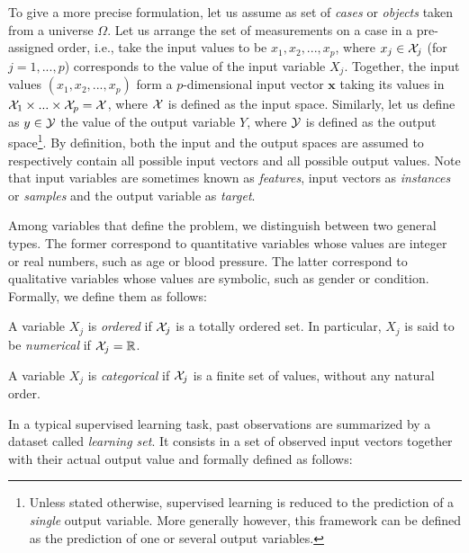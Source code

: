 To give a more precise formulation, let us assume as set of \textit{cases} or
\textit{objects} taken from a universe $\Omega$\label{ntn:omega}. Let us arrange the set of
measurements on a case in a pre-assigned order, i.e., take the input values to
be $x_1, x_2, ..., x_p$, where $x_j \in {\cal X}_j$\label{ntn:value-x_j}\label{ntn:space-X_j} (for $j = 1, ..., p$\label{ntn:p})
corresponds to the value of the input variable $X_j$\label{ntn:var-X_j}. Together, the input
values $(x_1, x_2, ..., x_p)$ form a $p$-dimensional input vector $\mathbf{x}$\label{ntn:sample-x}
taking its values in ${\cal X}_1 \times ... \times {\cal X}_p = {\cal X}$\label{ntn:space-X},
where ${\cal X}$ is defined as the input space. Similarly, let us define as $y
\in {\cal Y}$\label{ntn:value-y} the value of the output variable $Y$\label{ntn:var-Y}, where ${\cal Y}$\label{ntn:space-Y} is defined
as the output space\footnote{Unless stated otherwise, supervised learning is
reduced to the prediction of a \textit{single} output variable. More generally
however, this framework can be defined as the prediction of one or several
output variables.}. By definition, both the input and the output spaces are
assumed to respectively contain all possible input vectors and all possible
output values. Note that input variables are sometimes known as {\it features},
input vectors as {\it instances} or {\it samples} and the output variable as
{\it target}.

Among variables that define the problem, we distinguish between two general
types. The former correspond to quantitative variables whose values are integer
or real numbers, such as age or blood pressure. The latter correspond to
qualitative variables whose values are symbolic, such as gender or condition.
Formally, we define them as follows:

\begin{definition}
A variable $X_j$\label{ntn:var-X_j2} is \emph{ordered} if ${\cal X}_j$ is a
totally ordered set. In particular, $X_j$ is said to be \emph{numerical} if
${\cal X}_j = \mathbb{R}$.
\end{definition}

\begin{definition}
A variable $X_j$ is \emph{categorical} if ${\cal X}_j$ is a finite set of values,
without any natural order.
\end{definition}

In a typical supervised learning task, past observations are summarized by a
dataset called {\it learning set}. It consists in a set of observed input
vectors together with their actual output value and formally defined as
follows:

